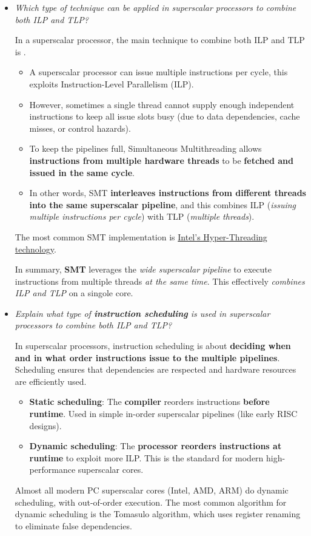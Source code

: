 \begin{itemize}
    \item \emph{Which type of technique can be applied in superscalar processors to combine both ILP and TLP?}
    
    \answer In a superscalar processor, the main technique to combine both ILP and TLP is .

    \begin{itemize}
        \item A superscalar processor can issue multiple instructions per cycle, this exploits Instruction-Level Parallelism (ILP).
        \item However, sometimes a single thread cannot supply enough independent instructions to keep all issue slots busy (due to data dependencies, cache misses, or control hazards).
        \item To keep the pipelines full, Simultaneous Multithreading allows \textbf{instructions from multiple hardware threads} to be \textbf{fetched and issued in the same cycle}.
        \item In other words, SMT \textbf{interleaves instructions from different threads into the same superscalar pipeline}, and this combines ILP (\emph{issuing multiple instructions per cycle}) with TLP (\emph{multiple threads}).
    \end{itemize}
    The most common SMT implementation is \href{https://www.intel.com/content/www/us/en/architecture-and-technology/hyper-threading/hyper-threading-technology.html}{Intel's Hyper-Threading technology}.

    In summary, \textbf{SMT} leverages the \emph{wide superscalar pipeline} to execute instructions from multiple threads \emph{at the same time}. This effectively \emph{combines ILP and TLP} on a singole core.


    \item \emph{Explain what type of \textbf{instruction scheduling} is used in superscalar processors to combine both ILP and TLP?}

    \answer In superscalar processors, instruction scheduling is about \textbf{deciding when and in what order instructions issue to the multiple pipelines}. Scheduling ensures that dependencies are respected and hardware resources are efficiently used.
    \begin{itemize}
        \item \textbf{Static scheduling}: The \textbf{compiler} reorders instructions \textbf{before runtime}. Used in simple in-order superscalar pipelines (like early RISC designs).
        \item \textbf{Dynamic scheduling}: The \textbf{processor reorders instructions at runtime} to exploit more ILP. This is the standard for modern high-performance superscalar cores.
    \end{itemize}
    Almost all modern PC superscalar cores (Intel, AMD, ARM) do dynamic scheduling, with out-of-order execution. The most common algorithm for dynamic scheduling is the Tomasulo algorithm, which uses register renaming to eliminate false dependencies.


\end{itemize}
